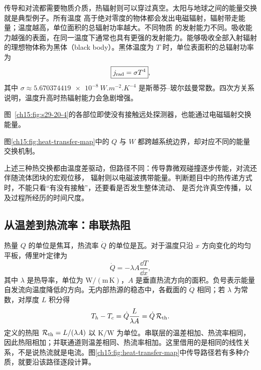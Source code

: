 {传导和对流都需要物质介质，热辐射则可以穿过真空。太阳与地球之间的能量交换就是典型例子。所有温度
高于绝对零度的物体都会发出电磁辐射，辐射带走能量；温度越高，单位面积的总辐射功率越大。不同物质
的发射能力不同。吸收能力越强的表面，在同一温度下通常也具有更强的发射能力。能够吸收全部入射辐射
的理想物体称为黑体（black body）。黑体温度为 $T$ 时，单位表面积的总辐射功率为
\begin{equation}
  \boxed{j_{\rm rad}=\sigma T^4}, \label{ch15:eq:s29-20-2}
\end{equation}
其中 $\sigma\approx\SI{5.670374419e-8}{W.m^{-2}.K^{-4}}$ 是斯蒂芬--玻尔兹曼常数。四次方关系
说明，温度升高时热辐射能力会急剧增强。

\par\noindent\begin{minipage}{\linewidth}
\label{ch15:fig:s29-20-4}
\end{minipage}\par\medskip
图~\ref{ch15:fig:s29-20-4}的各部位即使没有接触远处探测器，也能通过电磁辐射交换能量。

\par\noindent\begin{minipage}{\linewidth}
\heatTransferMapDiagram
{}\label{ch15:fig:heat-transfer-map}
\end{minipage}\par\medskip
图\ref{ch15:fig:heat-transfer-map}中的 $Q$ 与 $W$ 都跨越系统边界，却对应不同的能量交换机制。

上述三种热交换都由温度差驱动，但路径不同：传导靠微观碰撞逐步传能，对流还伴随流体团块的宏观位移，
辐射则以电磁波携带能量。判断题目中的热传递方式时，不能只看“有没有接触”，还要看是否发生整体流动、
是否允许真空传播，以及过程所经历的时间尺度。

\subsection{从温差到热流率：串联热阻}
热量 $Q$ 的单位是焦耳，热流率 $\dot Q$ 的单位是瓦。对于温度只沿 $x$ 方向变化的均匀平板，傅里叶定律为
\[
 \dot Q=-\lambda A\frac{\dd T}{\dd x},
\]
其中 $\lambda$ 是热导率，单位为 $\mathrm{W/(m\,K)}$，$A$ 是垂直热流方向的面积。负号表示能量自发流向温度降低的方向。无内部热源的稳态中，各截面的 $\dot Q$ 相同；若 $\lambda$ 为常数，对厚度 $L$ 积分得
\[
 T_h-T_c=\dot Q\frac{L}{\lambda A}=\dot Q\,\mathcal R_{\rm th}.
\]
定义的热阻 $\mathcal R_{\rm th}=L/(\lambda A)$ 以 $\mathrm{K/W}$ 为单位。串联层的温差相加、热流率相同，因此热阻相加；并联通道则温差相同、热流率相加。这里借用的是相同的线性关系，不是说热流就是电流。图\ref{ch15:fig:heat-transfer-map}中传导路径若有多种介质，就要沿该路径逐段计算。

}
